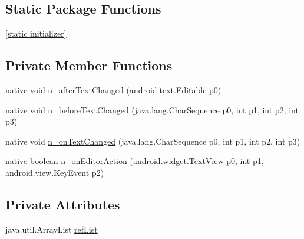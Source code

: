 \subsection*{Static Package Functions}
\begin{CompactItemize}
\item 
\hyperlink{classmd5b60ffeb829f638581ab2bb9b1a7f4f3f_1_1_entry_renderer_2ebca919e9e239ba2db4d8c41a15e6a4}{\mbox{[}static initializer\mbox{]}}
\end{CompactItemize}
\subsection*{Private Member Functions}
\begin{CompactItemize}
\item 
native void \hyperlink{classmd5b60ffeb829f638581ab2bb9b1a7f4f3f_1_1_entry_renderer_19c60f5a213260e268a0c3061f5c578b}{n\_\-afterTextChanged} (android.text.Editable p0)
\item 
native void \hyperlink{classmd5b60ffeb829f638581ab2bb9b1a7f4f3f_1_1_entry_renderer_5e50e6e61a8fdcb222dfa9c050b9be15}{n\_\-beforeTextChanged} (java.lang.CharSequence p0, int p1, int p2, int p3)
\item 
native void \hyperlink{classmd5b60ffeb829f638581ab2bb9b1a7f4f3f_1_1_entry_renderer_7ee8490c38f7d8a07c71c77cd5f9b329}{n\_\-onTextChanged} (java.lang.CharSequence p0, int p1, int p2, int p3)
\item 
native boolean \hyperlink{classmd5b60ffeb829f638581ab2bb9b1a7f4f3f_1_1_entry_renderer_44c5149ccd87fb1b791211a11c6dd8ee}{n\_\-onEditorAction} (android.widget.TextView p0, int p1, android.view.KeyEvent p2)
\end{CompactItemize}
\subsection*{Private Attributes}
\begin{CompactItemize}
\item 
java.util.ArrayList \hyperlink{classmd5b60ffeb829f638581ab2bb9b1a7f4f3f_1_1_entry_renderer_58f9f17859b75ef1547191607bb86aaa}{refList}
\end{CompactItemize}



